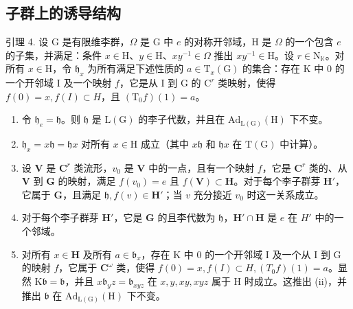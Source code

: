 \subsection{子群上的诱导结构}

引理 4. 设 G 是有限维李群，\(\Omega\) 是 G 中 \(e\) 的对称开邻域，H 是 \(\Omega\) 的一个包含 \(e\) 的子集，并满足：条件 \(x \in \mathrm{H}\)、\(y \in \mathrm{H}\)、\(xy^{-1} \in \Omega\) 推出 \(xy^{-1} \in \mathrm{H}\)。设 \(r \in \mathrm{N}_{\mathbb{K}}\)。对所有 \(x \in \mathrm{H}\)，令 \(\mathfrak{h}_x\) 为所有满足下述性质的 \(a \in \mathrm{T}_x(\mathrm{G})\) 的集合：存在 K 中 0 的一个开邻域 I 及一个映射 \(f\)，它是从 I 到 G 的 \(\mathrm{C}^r\) 类映射，使得 \(f(0) = x, f(I) \subset H\)，且 \((\mathrm{T}_0f)(1) = a\)。

\begin{enumerate}
\def\labelenumi{(\roman{enumi})}
\item
  令 \(\mathfrak{h}_e = \mathfrak{h}\)。则 \(\mathfrak{h}\) 是 \(\mathrm{L}(\mathrm{G})\) 的李子代数，并且在 \(\mathrm{Ad}_{\mathrm{L}(\mathrm{G})}(\mathrm{H})\) 下不变。
\item
  \(\mathfrak{h}_x = x\mathfrak{h} = \mathfrak{h}x\) 对所有 \(x\in \mathrm{H}\) 成立（其中 \(x\mathfrak{h}\) 和 \(\mathfrak{h}x\) 在 \(\mathrm{T(G)}\) 中计算）。
\item
  设 \(\mathbf{V}\) 是 \(\mathbf{C}^r\) 类流形，\(v_0\) 是 \(\mathbf{V}\) 中的一点，且有一个映射 \(f\)，它是 \(\mathbf{C}^r\) 类的、从 \(\mathbf{V}\) 到 \(\mathbf{G}\) 的映射，满足 \(f(v_0) = e\) 且 \(f(\mathbf{V}) \subset \mathbf{H}\)。对于每个李子群芽 \(\mathbf{H}'\)，它属于 \(\mathbf{G}\)，且满足 \(\mathfrak{h}, f(v) \in \mathbf{H}'\)；当 \(v\) 充分接近 \(v_0\) 时这一关系成立。
\item
  对于每个李子群芽 \(\mathbf{H}'\)，它是 \(\mathbf{G}\) 的且李代数为 \(\mathfrak{h}\)，\(\mathbf{H}' \cap \mathbf{H}\) 是 \(e\) 在 \(H'\) 中的一个邻域。
\item
  对所有 \(x \in \mathbf{H}\) 及所有 \(a \in \mathfrak{b}_x\)，存在 K 中 0 的一个开邻域 I 及一个从 I 到 G 的映射 \(f\)，它属于 \(\mathbf{C}^{\omega}\) 类，使得 \(f(0) = x, f(I) \subset H, (T_0f)(1) = a\)。显然 \(\mathrm{K}\mathfrak{b} = \mathfrak{b}\)，并且 \(x\mathfrak{b}_y z = \mathfrak{b}_{xyz}\) 在 \(x, y, xy, xyz\) 属于 H 时成立。这推出 (ii)，并推出 \(\mathfrak{b}\) 在 \(\mathrm{Ad}_{\mathrm{L(G)}}(\mathrm{H})\) 下不变。
\end{enumerate}

